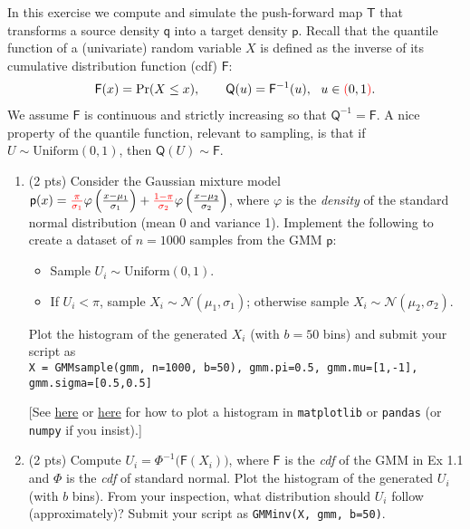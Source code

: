 \documentclass[10pt,letter,notitlepage]{article}
\newcommand{\Tsf}{\mathsf{T}}
\newcommand{\Fsf}{\mathsf{F}}
\newcommand{\pp}{\mathsf{p}}
\newcommand{\qq}{\mathsf{q}}
\newcommand{\Qsf}{\mathsf{Q}}
\newcommand{\red}[1]{{\color{red}#1}}
\newcounter{exercise}
\begin{document}
\begin{exercise}
	In this exercise we compute and simulate the push-forward map $\Tsf$ that transforms a source density $\qq$ into a target density $\pp$. Recall that the quantile function of a (univariate) random variable $X$ is defined as the inverse of its cumulative distribution function (cdf) $\Fsf$:
	\begin{align}
	\Fsf(x) = \Pr(X \leq x), \qquad
	\Qsf(u) = \Fsf^{-1}(u),~~ u \in \red{(}0,1 \red{)}.
	\end{align}
	We assume $\Fsf$ is continuous and strictly increasing so that $\Qsf^{-1} = \Fsf$. A nice property of the quantile function, relevant to sampling, is that if $U \sim \mathrm{Uniform}(0,1)$, then $\Qsf(U) \sim \Fsf$.

	\begin{enumerate}

		\item (2 pts) Consider the Gaussian mixture model $\pp(x) = \red{\tfrac{\pi}{\sigma_1}} \varphi\left( \frac{x-\mu_1}{\sigma_1}\right) + \red{\tfrac{1-\pi}{\sigma_2}} \varphi\left( \frac{x-\mu_2}{\sigma_2}\right)$, where $\varphi$ is the \emph{density} of the standard normal distribution (mean 0 and variance 1). Implement the following to create a dataset of $n=1000$ samples from the GMM $\pp$:
		\begin{itemize}
			\item Sample $U_i\sim \mathrm{Uniform}(0,1)$.
			\item If $U_i < \pi$, sample $X_i \sim \mathcal{N}(\mu_1, \sigma_1)$; otherwise sample $X_i \sim \mathcal{N}(\mu_2, \sigma_2)$.
		\end{itemize}
		Plot the histogram of the generated $X_i$ (with $b=50$ bins) and submit your script as \\ \verb|X = GMMsample(gmm, n=1000, b=50), gmm.pi=0.5, gmm.mu=[1,-1], gmm.sigma=[0.5,0.5]|

		[See \href{https://pythonspot.com/matplotlib-histogram/}{here} or \href{https://realpython.com/python-histograms/}{here} for how to plot a histogram in \verb|matplotlib| or \verb|pandas| (or \verb|numpy| if you insist).]

		\item (2 pts) Compute $U_i = \Phi^{-1}\big(\Fsf(X_i))$, where $\Fsf$ is the \emph{cdf} of the GMM in Ex 1.1 and $\Phi$ is the \emph{cdf} of standard normal. Plot the histogram of the generated $U_i$ (with $b$ bins). From your inspection, what distribution should $U_i$ follow (approximately)? Submit your script as \verb|GMMinv(X, gmm, b=50)|.


\end{enumerate}
\end{exercise}
\end{document}
